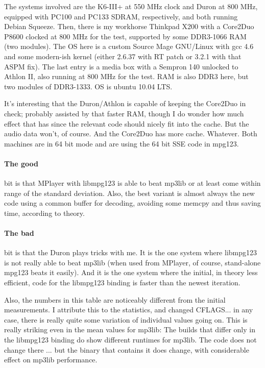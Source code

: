 \documentclass[a4paper,12pt]{scrartcl}
\begin{document}
The systems involved are the K6-III+ at 550 MHz clock and Duron at 800 MHz, equipped with PC100 and PC133 SDRAM, respectively, and both running Debian Squeeze.
Then, there is my workhorse Thinkpad X200 with a Core2Duo P8600 clocked at 800 MHz for the test, supported by some DDR3-1066 RAM (two modules).
The OS here is a custom Source Mage GNU/Linux with gcc 4.6 and some modern-ish kernel (either 2.6.37 with RT patch or 3.2.1 with that ASPM fix).
The last entry is a media box with a Sempron 140 unlocked to Athlon II, also running at 800 MHz for the test. RAM is also DDR3 here, but two modules of DDR3-1333. OS is ubuntu 10.04 LTS.

It's interesting that the Duron/Athlon is capable of keeping the Core2Duo in check; probably assisted by that faster RAM, though I do wonder how much effect that has since the relevant code should nicely fit into the cache. But the audio data won't, of course. And the Core2Duo has more cache. Whatever.
Both machines are in 64 bit mode and are using the 64 bit SSE code in mpg123.

\paragraph{The good}
bit is that MPlayer with libmpg123 is able to beat mp3lib or at least come within range of the standard deviation.
Also, the best variant is almost always the new code using a common buffer for decoding, avoiding some memcpy and thus saving time, according to theory.

\paragraph{The bad}
bit is that the Duron plays tricks with me.
It is the one system where libmpg123 is not really able to beat mp3lib (when used from MPlayer, of course, stand-alone mpg123 beats it easily).
And it is the one system where the initial, in theory less efficient, code for the libmpg123 binding is faster than the newest iteration.

Also, the numbers in this table are noticeably different from the initial measurements. I attribute this to the statistics, and changed CFLAGS... in any case, there is really quite some variation of individual values going on.
This is really striking even in the mean values for mp3lib:
The builds that differ only in the libmpg123 binding do show different runtimes for mp3lib.
The code does not change there ... but the binary that contains it does change, with considerable effect on mp3lib performance.
\end{document}
